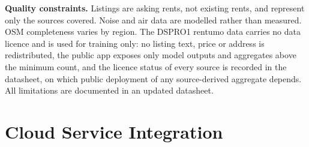 \documentclass[11pt,a4paper]{article}
\begin{document}
\textbf{Quality constraints.} Listings are asking rents, not existing rents, and represent only the sources covered. Noise and air data are modelled rather than measured. OSM completeness varies by region. The DSPRO1 rentumo data carries no data licence and is used for training only: no listing text, price or address is redistributed, the public app exposes only model outputs and aggregates above the minimum count, and the licence status of every source is recorded in the datasheet, on which public deployment of any source-derived aggregate depends. All limitations are documented in an updated datasheet.

\section{Cloud Service Integration}
\end{document}
